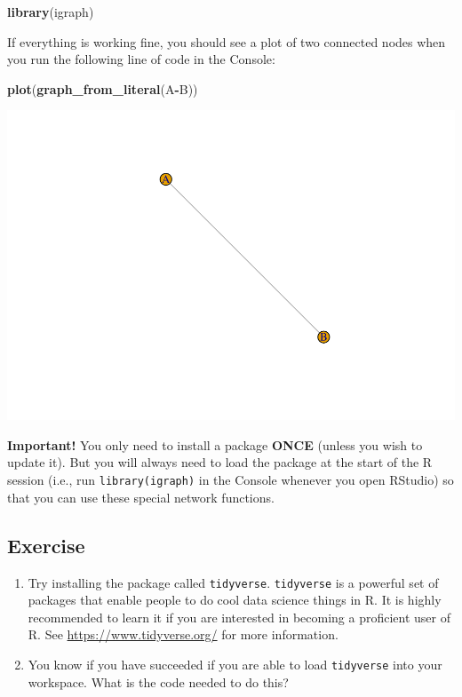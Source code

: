 \documentclass[
]{book}
\newenvironment{Shaded}{\begin{snugshade}}{\end{snugshade}}
\newcommand{\FunctionTok}[1]{\textcolor[rgb]{0.13,0.29,0.53}{\textbf{#1}}}
\newcommand{\NormalTok}[1]{#1}
\newcommand{\SpecialCharTok}[1]{\textcolor[rgb]{0.81,0.36,0.00}{\textbf{#1}}}
\begin{document}
\begin{Shaded}
\begin{Highlighting}[]
\FunctionTok{library}\NormalTok{(igraph)}
\end{Highlighting}
\end{Shaded}

If everything is working fine, you should see a plot of two connected nodes when you run the following line of code in the Console:

\begin{Shaded}
\begin{Highlighting}[]
\FunctionTok{plot}\NormalTok{(}\FunctionTok{graph\_from\_literal}\NormalTok{(A}\SpecialCharTok{{-}}\NormalTok{B))}
\end{Highlighting}
\end{Shaded}

\includegraphics{bookdown-demo_files/figure-latex/unnamed-chunk-46-1.pdf}

\textbf{Important!} You only need to install a package \textbf{ONCE} (unless you wish to update it). But you will always need to load the package at the start of the R session (i.e., run \texttt{library(igraph)} in the Console whenever you open RStudio) so that you can use these special network functions.

\subsection{Exercise}\label{exercise}

\begin{enumerate}
\def\labelenumi{\arabic{enumi}.}
\item
  Try installing the package called \texttt{tidyverse}. \texttt{tidyverse} is a powerful set of packages that enable people to do cool data science things in R. It is highly recommended to learn it if you are interested in becoming a proficient user of R. See \url{https://www.tidyverse.org/} for more information.
\item
  You know if you have succeeded if you are able to load \texttt{tidyverse} into your workspace. What is the code needed to do this?
\end{enumerate}
\end{document}
